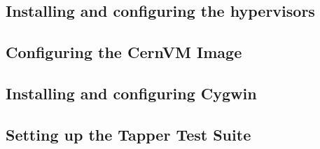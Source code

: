 \newpage
\subsection{Installing and configuring the hypervisors}
\subsection{Configuring the CernVM Image}
\subsection{Installing and configuring Cygwin}
%
\subsection{Setting up the Tapper Test Suite}
